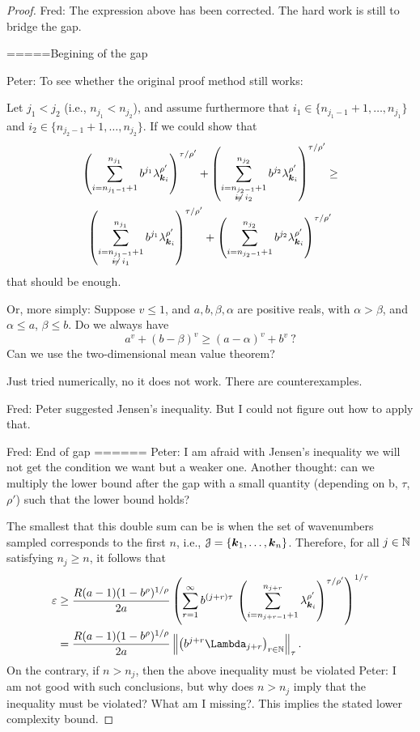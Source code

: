 \documentclass[USenglish]{article}
\theoremstyle{dgthm}
\theoremstyle{dgthm}
\theoremstyle{dgthm}
\theoremstyle{dgthm}
\theoremstyle{dgdef}
\theoremstyle{definition}
\newcommand{\norm}[2][{}]{\ensuremath{\left \lVert #2 \right \rVert}_{#1}}
\newcommand{\FredNote}[1]{{\color{blue}Fred: #1}}
\newcommand{\PeterNote}[1]{{\color{orange}Peter: #1}}
\begin{document}
\begin{proof}
\FredNote{The expression above has been corrected.  The hard work is still to bridge the gap.

=====Begining of the gap}

\PeterNote{To see whether the original proof method still works:

\medskip

Let $j_1<j_2$ (i.e., $n_{j_1} < n_{j_2}$), and assume furthermore 
that $i_1\in \{n_{j_1-1}+1,\ldots,n_{j_1}\}$ and $i_2\in \{n_{j_2-1}+1,\ldots,n_{j_2}\}$. If we could 
show that
\begin{multline*}
 \left(\sum_{i=n_{j_1-1}+1}^{n_{j_1}} b^{j_1} \lambda_{\bsk_i}^{\rho'}\right)^{\tau/\rho'} +
 \left(\sum_{\substack{i=n_{j_2-1}+1\\ i\neq i_2}}^{n_{j_2}} b^{j_2} \lambda_{\bsk_i}^{\rho'}\right)^{\tau/\rho'}\ge\\
  \left(\sum_{\substack{i=n_{j_1-1}+1\\ i \neq i_1}}^{n_{j_1}} b^{j_1} \lambda_{\bsk_i}^{\rho'}\right)^{\tau/\rho'} +
 \left(\sum_{i=n_{j_2-1}+1}^{n_{j_2}} b^{j_2} \lambda_{\bsk_i}^{\rho'}\right)^{\tau/\rho'}
\end{multline*}
that should be enough.

Or, more simply: Suppose $v\le 1$, and $a,b,\beta,\alpha$ are positive reals, with $\alpha>\beta$, 
and $\alpha\le a$, $\beta\le b$. 
Do we always have
\[
 a^v + (b-\beta)^v \ge (a-\alpha)^v + b^v\ ?
\]
Can we use the two-dimensional mean value theorem?

Just tried numerically, no it does not work. There are counterexamples.
}

\FredNote{Peter suggested Jensen's inequality.  But I could not figure out how to apply that.
}


\FredNote{End of gap ======}
\PeterNote{I am afraid with Jensen's inequality we will not get the condition we want but a weaker one. Another thought: can we multiply the lower bound after the gap with a small quantity (depending on b, $\tau$, $\rho'$) such that the lower bound holds?}


The smallest that this double sum can be is when the set of wavenumbers sampled corresponds to the first $n$, i.e., ${\mathcal{J}} = \{{\boldsymbol{k}}_1, \ldots, {\boldsymbol{k}}_n\}$.  Therefore, for all $j \in {\mathbb{N}}$ satisfying $n_{j} \ge n$, it follows that 
\begin{align*}
    \varepsilon & \ge \frac{R(a-1)(1 - b^\rho)^{1/\rho}}{2a} \left(\sum_{r=1}^\infty b^{(j+r)\tau}  \, \left(\sum_{i=n_{j+r-1}+1}^{n_{j+r}}  \lambda_{\bsk_i}^{\rho'} \right)^{\tau/\rho'} \right)^{1/\tau} \\
    & = \frac{R(a-1)(1 - b^\rho)^{1/\rho}}{2a} \norm[\tau]{\bigl(b^{j+r} \Lambda_{j+r} \bigr)_{r \in \N}}.
\end{align*}
On the contrary, if $n > n_j$, then the above inequality must be violated \PeterNote{I am not good with such conclusions, but why does $n> n_j$ imply that the inequality must be violated? What am I missing?}.  This implies the stated lower complexity bound. 


\end{proof}
\end{document}
